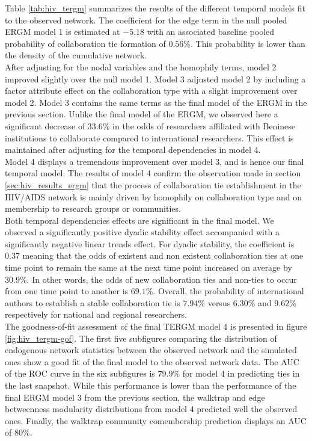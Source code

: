 Table \ref{tab:hiv_tergm} summarizes the results of the different temporal models fit to the observed network. The coefficient for the edge term in the null pooled ERGM model 1 is estimated at $-5.18$ with an associated baseline pooled probability of collaboration tie formation of $0.56\%$. This probability is lower than the density of the cumulative network.\\
After adjusting for the nodal variables and the homophily terms, model 2 improved slightly over the null model 1. Model 3 adjusted model 2 by including a factor attribute effect on the collaboration type with a slight improvement over model 2. Model 3 contains the same terms as the final model of the ERGM in the previous section. Unlike the final model of the ERGM, we observed here a significant decrease of $33.6\%$ in the odds of researchers affiliated with Beninese institutions to collaborate compared to international researchers. This effect is maintained after adjusting for the temporal dependencies in model 4. \\
Model 4 displays a tremendous improvement over model 3, and is hence our final temporal model. The results of model 4 confirm the observation made in section \ref{sec:hiv_results_ergm} that the process of collaboration tie establishment in the HIV/AIDS network is mainly driven by homophily on collaboration type and on membership to research groups or communities. \\
Both temporal dependencies effects are significant in the final model. We observed a significantly positive dyadic stability effect accompanied with a significantly negative linear trends effect. For dyadic stability, the coefficient is $0.37$ meaning that the odds of existent and non existent collaboration ties at one time point to remain the same at the next time point increased on average by $30.9\%$. In other words, the odds of new collaboration ties and non-ties to occur from one time point to another is $69.1\%$. Overall, the probability of international authors to establish a stable collaboration tie is $7.94\%$ versus $6.30\%$ and $9.62\%$ respectively for national and regional researchers.\\
The goodness-of-fit assessment of the final TERGM model 4 is presented in figure \ref{fig:hiv_tergm-gof}. The first five subfigures comparing the distribution of endogenous network statistics between the observed network and the simulated ones show a good fit of the final model to the observed network data. The AUC of the ROC curve in the six subfigures is $79.9\%$ for model 4 in predicting ties in the last snapshot. While this performance is lower than the performance of the final ERGM model 3 from the previous section, the walktrap and edge betweenness modularity distributions from model 4 predicted well the observed ones. Finally, the walktrap community comembership prediction displays an AUC of $80\%$. %


